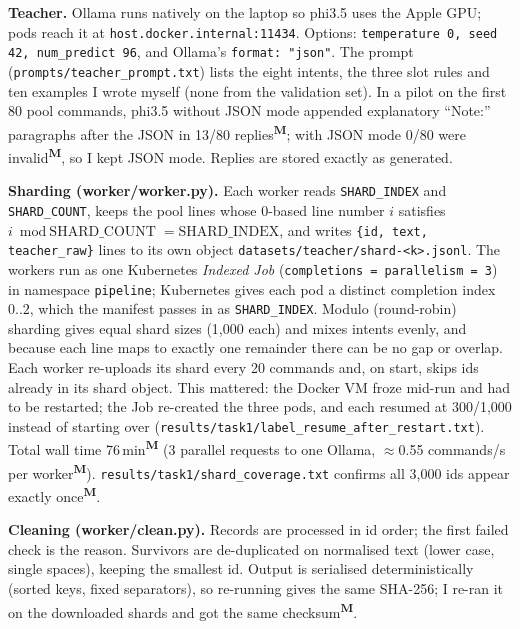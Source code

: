 \documentclass[10pt,a4paper]{article}
\newcommand{\code}[1]{\texttt{\small #1}}
\newcommand{\meas}{\textsuperscript{\textbf{M}}}
\begin{document}
\textbf{Teacher.} Ollama runs natively on the laptop so phi3.5 uses the Apple GPU; pods reach it at
\code{host.docker.internal:11434}. Options: \code{temperature 0, seed 42, num\_predict 96}, and Ollama's
\code{format: "json"}. The prompt (\code{prompts/teacher\_prompt.txt}) lists the eight intents, the three slot
rules and ten examples I wrote myself (none from the validation set). In a pilot on the first 80 pool commands,
phi3.5 without JSON mode appended explanatory ``Note:'' paragraphs after the JSON in 13/80 replies\meas{}; with JSON
mode 0/80 were invalid\meas{}, so I kept JSON mode. Replies are stored exactly as generated.

\textbf{Sharding (worker/worker.py).} Each worker reads \code{SHARD\_INDEX} and \code{SHARD\_COUNT}, keeps the
pool lines whose 0-based line number $i$ satisfies $i \bmod \text{SHARD\_COUNT} = \text{SHARD\_INDEX}$, and writes
\code{\{id, text, teacher\_raw\}} lines to its own object \code{datasets/teacher/shard-<k>.jsonl}. The workers run
as one Kubernetes \emph{Indexed Job} (\code{completions = parallelism = 3}) in namespace \code{pipeline}; Kubernetes
gives each pod a distinct completion index $0..2$, which the manifest passes in as \code{SHARD\_INDEX}. Modulo
(round-robin) sharding gives equal shard sizes (1,000 each) and mixes intents evenly, and because each line maps to
exactly one remainder there can be no gap or overlap. Each worker re-uploads its shard every 20 commands and, on
start, skips ids already in its shard object. This mattered: the Docker VM froze mid-run and had to be restarted;
the Job re-created the three pods, and each resumed at 300/1,000 instead of starting over
(\code{results/task1/label\_resume\_after\_restart.txt}). Total wall time 76\,min\meas{} (3 parallel requests to
one Ollama, $\approx$0.55 commands/s per worker\meas{}).
\code{results/task1/shard\_coverage.txt} confirms all 3,000 ids appear exactly once\meas{}.

\textbf{Cleaning (worker/clean.py).} Records are processed in id order; the first failed check is the reason.
Survivors are de-duplicated on normalised text (lower case, single spaces), keeping the smallest id. Output is
serialised deterministically (sorted keys, fixed separators), so re-running gives the same SHA-256; I re-ran it on
the downloaded shards and got the same checksum\meas{}.
\end{document}
